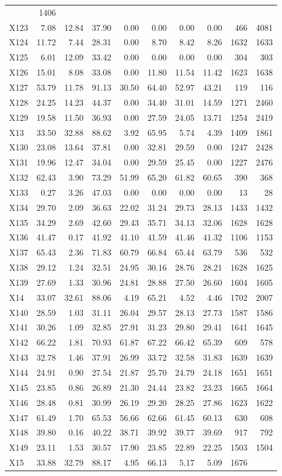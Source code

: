 \documentclass[
]{article}
\begin{document}
\begin{longtable}[]{@{}lrrrrrrrrr@{}}
& 1406\tabularnewline
X123 & 7.08 & 12.84 & 37.90 & 0.00 & 0.00 & 0.00 & 0.00 & 466 &
4081\tabularnewline
X124 & 11.72 & 7.44 & 28.31 & 0.00 & 8.70 & 8.42 & 8.26 & 1632 &
1633\tabularnewline
X125 & 6.01 & 12.09 & 33.42 & 0.00 & 0.00 & 0.00 & 0.00 & 304 &
303\tabularnewline
X126 & 15.01 & 8.08 & 33.08 & 0.00 & 11.80 & 11.54 & 11.42 & 1623 &
1638\tabularnewline
X127 & 53.79 & 11.78 & 91.13 & 30.50 & 64.40 & 52.97 & 43.21 & 119 &
116\tabularnewline
X128 & 24.25 & 14.23 & 44.37 & 0.00 & 34.40 & 31.01 & 14.59 & 1271 &
2460\tabularnewline
X129 & 19.58 & 11.50 & 36.93 & 0.00 & 27.59 & 24.05 & 13.71 & 1254 &
2419\tabularnewline
X13 & 33.50 & 32.88 & 88.62 & 3.92 & 65.95 & 5.74 & 4.39 & 1409 &
1861\tabularnewline
X130 & 23.08 & 13.64 & 37.81 & 0.00 & 32.81 & 29.59 & 0.00 & 1247 &
2428\tabularnewline
X131 & 19.96 & 12.47 & 34.04 & 0.00 & 29.59 & 25.45 & 0.00 & 1227 &
2476\tabularnewline
X132 & 62.43 & 3.90 & 73.29 & 51.99 & 65.20 & 61.82 & 60.65 & 390 &
368\tabularnewline
X133 & 0.27 & 3.26 & 47.03 & 0.00 & 0.00 & 0.00 & 0.00 & 13 &
28\tabularnewline
X134 & 29.70 & 2.09 & 36.63 & 22.02 & 31.24 & 29.73 & 28.13 & 1433 &
1432\tabularnewline
X135 & 34.29 & 2.69 & 42.60 & 29.43 & 35.71 & 34.13 & 32.06 & 1628 &
1628\tabularnewline
X136 & 41.47 & 0.17 & 41.92 & 41.10 & 41.59 & 41.46 & 41.32 & 1106 &
1153\tabularnewline
X137 & 65.43 & 2.36 & 71.83 & 60.79 & 66.84 & 65.44 & 63.79 & 536 &
532\tabularnewline
X138 & 29.12 & 1.24 & 32.51 & 24.95 & 30.16 & 28.76 & 28.21 & 1628 &
1625\tabularnewline
X139 & 27.69 & 1.33 & 30.96 & 24.81 & 28.88 & 27.50 & 26.60 & 1604 &
1605\tabularnewline
X14 & 33.07 & 32.61 & 88.06 & 4.19 & 65.21 & 4.52 & 4.46 & 1702 &
2007\tabularnewline
X140 & 28.59 & 1.03 & 31.11 & 26.04 & 29.57 & 28.13 & 27.73 & 1587 &
1586\tabularnewline
X141 & 30.26 & 1.09 & 32.85 & 27.91 & 31.23 & 29.80 & 29.41 & 1641 &
1645\tabularnewline
X142 & 66.22 & 1.81 & 70.93 & 61.87 & 67.22 & 66.42 & 65.39 & 609 &
578\tabularnewline
X143 & 32.78 & 1.46 & 37.91 & 26.99 & 33.72 & 32.58 & 31.83 & 1639 &
1639\tabularnewline
X144 & 24.91 & 0.90 & 27.54 & 21.87 & 25.70 & 24.79 & 24.18 & 1651 &
1651\tabularnewline
X145 & 23.85 & 0.86 & 26.89 & 21.30 & 24.44 & 23.82 & 23.23 & 1665 &
1664\tabularnewline
X146 & 28.48 & 0.81 & 30.99 & 26.19 & 29.20 & 28.25 & 27.86 & 1623 &
1622\tabularnewline
X147 & 61.49 & 1.70 & 65.53 & 56.66 & 62.66 & 61.45 & 60.13 & 630 &
608\tabularnewline
X148 & 39.80 & 0.16 & 40.22 & 38.71 & 39.92 & 39.77 & 39.69 & 917 &
792\tabularnewline
X149 & 23.11 & 1.53 & 30.57 & 17.90 & 23.85 & 22.89 & 22.25 & 1503 &
1504\tabularnewline
X15 & 33.88 & 32.79 & 88.17 & 4.95 & 66.13 & 5.17 & 5.09 & 1676 &

\end{longtable}
\end{document}
